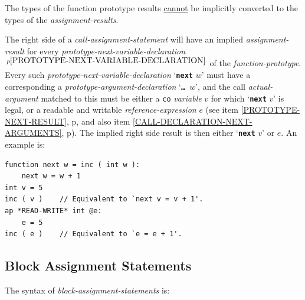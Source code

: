 \documentclass[12pt]{article}
\newcommand{\TT}[1]{{\tt \bfseries #1}}
\newcommand{\pagref}[1]{p\pageref{#1}}
\newcommand{\pagnote}[1]{$\,^{p\pageref{#1}}$}
\newenvironment{indpar}[1][0.3in]%
	{\begin{list}{}%
		     {\setlength{\itemsep}{0in}%
		      \setlength{\topsep}{0in}%
		      \setlength{\parsep}{1ex}%
		      \setlength{\labelwidth}{#1}%
		      \setlength{\leftmargin}{#1}%
		      \addtolength{\leftmargin}{\labelsep}}%
	 \item}%
	{\end{list}}
\begin{document}
The types of the function prototype results \underline{cannot}
be implicitly converted to the types of the {\em assignment-results}.

\label{CALL-NEXT-PROMOTION}
The right side of a {\em call-assignment-statement} will have
an implied {\em assignment-result} for every
{\em prototype-next-variable-declaration}%
\pagnote{PROTOTYPE-NEXT-VARIABLE-DECLARATION}%
of the
{\em function-prototype}.  Every such
{\em prototype-next-variable-declaration} `\TT{next} $w$'
must have a corresponding 
a {\em prototype-argument-declaration} `{\TT{\ldots}~$w$}',
and the call {\em actual-argument}
matched to this must be either
a {\tt co} {\em variable} $v$ for which `\TT{next} $v$' is legal,
or a readable and writable {\em reference-expression} $e$
(see item \ref{PROTOTYPE-NEXT-RESULT}, \pagref{PROTOTYPE-NEXT-RESULT},
and also item \ref{CALL-DECLARATION-NEXT-ARGUMENTS},
\pagref{CALL-DECLARATION-NEXT-ARGUMENTS}).
The implied right side result
is then either `\TT{next} $v$' or $e$.  An example is:
\begin{indpar}\begin{verbatim}
function next w = inc ( int w ):
    next w = w + 1
int v = 5
inc ( v )    // Equivalent to `next v = v + 1'.
ap *READ-WRITE* int @e:
    e = 5
inc ( e )    // Equivalent to `e = e + 1'.
\end{verbatim}\end{indpar}

\subsection{Block Assignment Statements}
\label{BLOCK-ASSIGNMENT-STATEMENTS}

The syntax of {\em block-assignment-statements} is:
\end{document}
